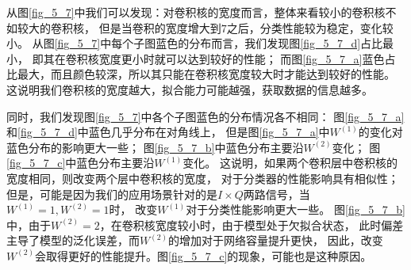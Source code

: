 从图\ref{fig_5_7}中我们可以发现：对卷积核的宽度而言，整体来看较小的卷积核不如较大的卷积核，
但是当卷积的宽度增大到$7$之后，分类性能较为稳定，变化较小。
从图\ref{fig_5_7}中每个子图蓝色的分布而言，我们发现图\ref{fig_5_7_d}占比最小，
即其在卷积核宽度更小时就可以达到较好的性能；
而图\ref{fig_5_7_a}蓝色占比最大，而且颜色较深，所以其只能在卷积核宽度较大时才能达到较好的性能。
这说明我们卷积核的宽度越大，拟合能力可能越强，获取数据的信息越多。\par

同时，我们发现图\ref{fig_5_7}中各个子图蓝色的分布情况各不相同：
图\ref{fig_5_7_a}和\ref{fig_5_7_d}中蓝色几乎分布在对角线上，
但是图\ref{fig_5_7_a}中$W^{(1)}$的变化对蓝色分布的影响更大一些；
图\ref{fig_5_7_b}中蓝色分布主要沿$W^{(2)}$变化；
图\ref{fig_5_7_c}中蓝色分布主要沿$W^{(1)}$变化。
这说明，如果两个卷积层中卷积核的宽度相同，则改变两个层中卷积核的宽度，
对于分类器的性能影响具有相似性；
但是，可能是因为我们的应用场景针对的是$I \times Q$两路信号，当$W^{(1)}=1, W^{(2)}=1$时，
改变$W^{(1)}$对于分类性能影响更大一些。
图\ref{fig_5_7_b}中，由于$W^{(2)}=2$，在卷积核宽度较小时，由于模型处于欠拟合状态，
此时偏差主导了模型的泛化误差，而$W^{(2)}$的增加对于网络容量提升更快，
因此，改变$W^{(2)}$会取得更好的性能提升。图\ref{fig_5_7_c}的现象，可能也是这种原因。\par
